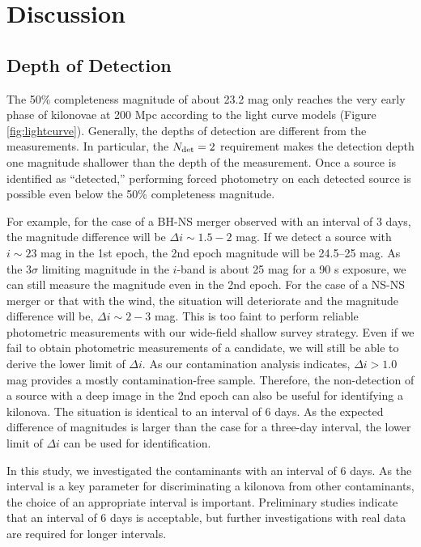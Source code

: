 \documentclass[]{pasj01}
\begin{document}
\section{Discussion}

\subsection{Depth of Detection}
The 50\% completeness magnitude of about 23.2 mag only reaches the very early phase of kilonovae at 200 Mpc according to the light curve models (Figure \ref{fig:lightcurve}).
Generally, the depths of detection are different from the measurements.
In particular, the $N_{\rm det}=2$ requirement makes the detection depth one magnitude shallower than the depth of the measurement.
Once a source is identified as ``detected,'' performing forced photometry on each detected source is possible even below the 50\% completeness magnitude.

For example, for the case of a BH-NS merger observed with an interval of 3 days, the magnitude difference will be $\Delta i\sim 1.5-2$ mag.
If we detect a source with $i\sim 23$ mag in the 1st epoch, the 2nd epoch magnitude will be 24.5--25 mag.
As the $3\sigma$ limiting magnitude in the $i$-band is about 25 mag for a 90 s exposure,
we can still measure the magnitude even in the 2nd epoch.
For the case of a NS-NS merger or that with the wind, the situation will deteriorate 
and the magnitude difference will be, $\Delta i\sim 2-3$ mag.
This is too faint to perform  reliable photometric measurements with our wide-field shallow survey strategy.
Even if we fail to obtain photometric measurements of a candidate, we will still be able to derive the lower limit of $\Delta i$.
As our contamination analysis indicates, $\Delta i>1.0$ mag provides a mostly contamination-free sample.
Therefore, the non-detection of a source with a  deep image in the 2nd epoch can also be useful for identifying a kilonova.
The situation is identical to an interval of 6 days.
As the expected difference of magnitudes is larger than the case for a three-day interval, 
the lower limit of $\Delta i$ can be used for identification.

In this study, we investigated the contaminants with an interval of 6 days.
As the interval is a key parameter for discriminating a kilonova from other contaminants, 
the choice of an appropriate interval is important.
 Preliminary studies indicate that an interval of 6 days is acceptable, but further investigations with real data are required for longer intervals.
\end{document}
